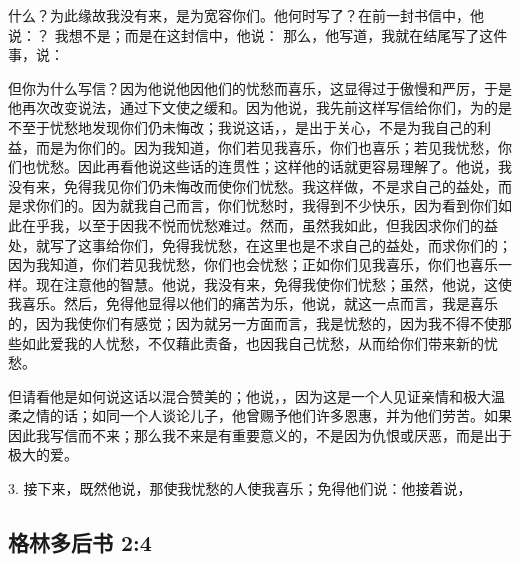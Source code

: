 什么？为此缘故我没有来，是为宽容你们。他何时写了？在前一封书信中，他说：？ 我想不是；而是在这封信中，他说： 那么，他写道，我就在结尾写了这件事，说：\par

但你为什么写信？因为他说他因他们的忧愁而喜乐，这显得过于傲慢和严厉，于是他再次改变说法，通过下文使之缓和。因为他说，我先前这样写信给你们，为的是不至于忧愁地发现你们仍未悔改；我说这话，，是出于关心，不是为我自己的利益，而是为你们的。因为我知道，你们若见我喜乐，你们也喜乐；若见我忧愁，你们也忧愁。因此再看他说这些话的连贯性；这样他的话就更容易理解了。他说，我没有来，免得我见你们仍未悔改而使你们忧愁。我这样做，不是求自己的益处，而是求你们的。因为就我自己而言，你们忧愁时，我得到不少快乐，因为看到你们如此在乎我，以至于因我不悦而忧愁难过。然而，虽然我如此，但我因求你们的益处，就写了这事给你们，免得我忧愁，在这里也是不求自己的益处，而求你们的；因为我知道，你们若见我忧愁，你们也会忧愁；正如你们见我喜乐，你们也喜乐一样。现在注意他的智慧。他说，我没有来，免得我使你们忧愁；虽然，他说，这使我喜乐。然后，免得他显得以他们的痛苦为乐，他说，就这一点而言，我是喜乐的，因为我使你们有感觉；因为就另一方面而言，我是忧愁的，因为我不得不使那些如此爱我的人忧愁，不仅藉此责备，也因我自己忧愁，从而给你们带来新的忧愁。\par

但请看他是如何说这话以混合赞美的；他说，，因为这是一个人见证亲情和极大温柔之情的话；如同一个人谈论儿子，他曾赐予他们许多恩惠，并为他们劳苦。如果因此我写信而不来；那么我不来是有重要意义的，不是因为仇恨或厌恶，而是出于极大的爱。\par

3. 接下来，既然他说，那使我忧愁的人使我喜乐；免得他们说：他接着说，\par


\subsection{格林多后书 2:4}

